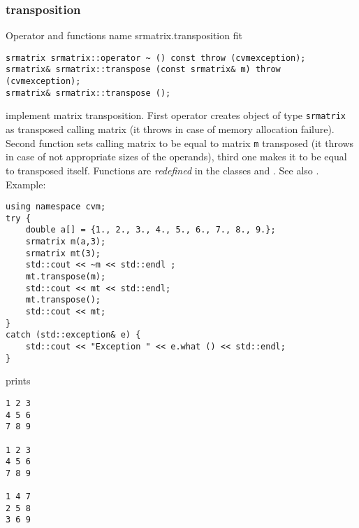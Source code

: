 \subsubsection{transposition}
Operator and functions%
\pdfdest name {srmatrix.transposition} fit
\begin{verbatim}
srmatrix srmatrix::operator ~ () const throw (cvmexception);
srmatrix& srmatrix::transpose (const srmatrix& m) throw (cvmexception);
srmatrix& srmatrix::transpose ();
\end{verbatim}
implement matrix transposition.
First operator creates  object of type \verb"srmatrix" as
 transposed calling matrix
(it throws  
in case of memory allocation failure). 
Second function sets  calling matrix to be equal to  matrix
\verb"m" transposed
(it throws  
in case of not appropriate sizes of the operands), 
third one makes it to be equal to
transposed itself. 
Functions are \emph{redefined} in the classes
and .
See also .
Example:
\begin{Verbatim}
using namespace cvm;
try {
    double a[] = {1., 2., 3., 4., 5., 6., 7., 8., 9.};
    srmatrix m(a,3);
    srmatrix mt(3);
    std::cout << ~m << std::endl ;
    mt.transpose(m);
    std::cout << mt << std::endl;
    mt.transpose();
    std::cout << mt;
}
catch (std::exception& e) {
    std::cout << "Exception " << e.what () << std::endl;
}
\end{Verbatim}
prints
\begin{Verbatim}
1 2 3
4 5 6
7 8 9

1 2 3
4 5 6
7 8 9

1 4 7
2 5 8
3 6 9
\end{Verbatim}
\newpage



